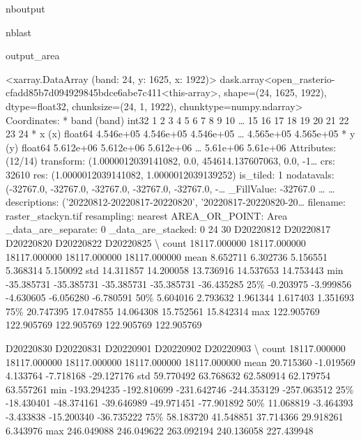 \documentclass[letterpaper,10pt]{sphinxmanual}
\begin{document}
\begin{sphinxuseclass}{nboutput}
\begin{sphinxuseclass}{nblast}
{\begin{sphinxuseclass}{output_area}
\begin{sphinxuseclass}{}
\begin{sphinxVerbatim}
<xarray.DataArray (band: 24, y: 1625, x: 1922)>
dask.array<open\_rasterio-cfadd85b7d094929845bdce6abe7c411<this-array>, shape=(24, 1625, 1922), dtype=float32, chunksize=(24, 1, 1922), chunktype=numpy.ndarray>
Coordinates:
  * band     (band) int32 1 2 3 4 5 6 7 8 9 10 {\ldots} 15 16 17 18 19 20 21 22 23 24
  * x        (x) float64 4.546e+05 4.546e+05 4.546e+05 {\ldots} 4.565e+05 4.565e+05
  * y        (y) float64 5.612e+06 5.612e+06 5.612e+06 {\ldots} 5.61e+06 5.61e+06
Attributes: (12/14)
    transform:           (1.0000012039141082, 0.0, 454614.137607063, 0.0, -1{\ldots}
    crs:                 32610
    res:                 (1.0000012039141082, 1.0000012039139252)
    is\_tiled:            1
    nodatavals:          (-32767.0, -32767.0, -32767.0, -32767.0, -32767.0, -{\ldots}
    \_FillValue:          -32767.0
    {\ldots}                  {\ldots}
    descriptions:        ('20220812-20220817-20220820', '20220817-20220820-20{\ldots}
    filename:            raster\_stackyn.tif
    resampling:          nearest
    AREA\_OR\_POINT:       Area
    \_data\_are\_separate:  0
    \_data\_are\_stacked:   0
24
30
          D20220812     D20220817     D20220820     D20220822     D20220825  \textbackslash{}
count  18117.000000  18117.000000  18117.000000  18117.000000  18117.000000
mean       8.652711      6.302736      5.156551      5.368314      5.150092
std       14.311857     14.200058     13.736916     14.537653     14.753443
min      -35.385731    -35.385731    -35.385731    -35.385731    -36.435285
25\%       -0.203975     -3.999856     -4.630605     -6.056280     -6.780591
50\%        5.604016      2.793632      1.961344      1.617403      1.351693
75\%       20.747395     17.047855     14.064308     15.752561     15.842314
max      122.905769    122.905769    122.905769    122.905769    122.905769

          D20220830     D20220831     D20220901     D20220902     D20220903  \textbackslash{}
count  18117.000000  18117.000000  18117.000000  18117.000000  18117.000000
mean      20.715360     -1.019569      4.133764     -7.718168    -29.127176
std       59.770492     63.768632     62.580914     62.179754     63.557261
min     -193.294235   -192.810699   -231.642746   -244.353129   -257.063512
25\%      -18.430401    -48.374161    -39.646989    -49.971451    -77.901892
50\%       11.068819     -3.464393     -3.433838    -15.200340    -36.735222
75\%       58.183720     41.548851     37.714366     29.918261      6.343976
max      246.049088    246.049622    263.092194    240.136058    227.439948


\end{sphinxVerbatim}
\end{sphinxuseclass}
\end{sphinxuseclass}}
\end{sphinxuseclass}
\end{sphinxuseclass}
\end{document}

